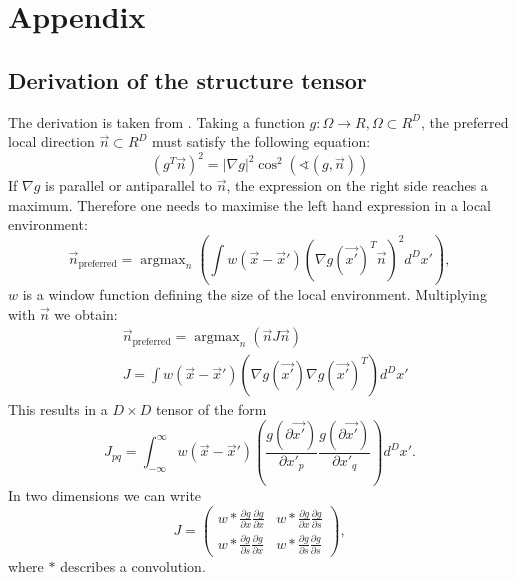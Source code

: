 \documentclass  [
  paper    = a4,
  BCOR     = 10mm,
  twoside,
  fontsize = 12pt,
  fleqn,
  toc      = bibnumbered,
  toc      = listofnumbered,
  numbers  = noendperiod,
  headings = normal,
  listof   = leveldown,
  version  = 3.03
]                                       {scrreprt}
\DeclareMathOperator*{\argmax}{argmax}
\begin{document}
  \part*{Appendix}
  \begin{appendix}
  	\chapter{Derivation of the structure tensor}
  	The derivation is taken from \cite{jahne2013digitale}. Taking a function $g:\Omega\rightarrow \!R, \Omega \subset \!R^D$, the preferred local direction $\vec{n} \subset \!R^D$ must satisfy the following equation:
  	\begin{equation}\label{key}
  	( g^T\vec{n})^2 = |\nabla g |^2 \cos^2(\sphericalangle (g, \vec{n}))
  	\end{equation}
  	If $\nabla g$ is parallel or antiparallel to $\vec{n}$, the expression on the right side reaches a maximum. Therefore one needs to maximise the left hand expression in a local environment:
  	\begin{equation}\label{key}
  	\vec n_\text{preferred} = \argmax_n\left(\int w(\vec x - \vec x')\left(\nabla g(\vec{x'})^T \vec{n}\right)^2d^Dx' \right),
  	\end{equation}
  	$w$ is a window function defining the size of the local environment. Multiplying with $\vec{n}$
  	we obtain:
  	\begin{align}\label{key}
  	&\vec n_\text{preferred} = \argmax_n\left(\vec n  J \vec n \right)\\
  	& J = \int w(\vec x - \vec x')\left(\nabla g(\vec{x'}) \nabla g(\vec{x'})^T\right)d^Dx'
  	\end{align}
  	This results in a $D\times D $ tensor of the form
  	\begin{equation}\label{key}
  	J_{pq} = \int_{-\infty}^{\infty} w(\vec x - \vec x')\left(\frac{g(\partial\vec{x'})}{\partial x'_p} \frac{g(\partial\vec{x'})}{\partial x'_q}\right)d^Dx'.
  	\end{equation}
  	In two dimensions we can write
	\begin{equation}\label{key}
	J =\left(
	\begin{matrix}
	w*\frac{\partial g}{\partial x}\frac{\partial g}{\partial x} & w*\frac{\partial g}{\partial x}\frac{\partial g}{\partial s} \\
	w*\frac{\partial g}{\partial s}\frac{\partial g}{\partial x} & w*\frac{\partial g}{\partial s}\frac{\partial g}{\partial s} 
	\end{matrix}\right),
	\end{equation}  
	where \glqq $*$ \grqq describes a convolution.	
  	

\end{appendix}
\end{document}
